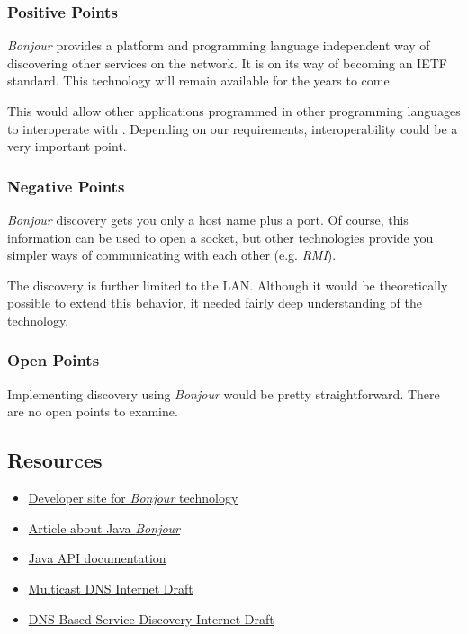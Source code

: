 \subsubsection{Positive Points}
\emph{Bonjour} provides a platform and programming language independent way of discovering other services on the network. It is on its way of becoming an IETF standard. This technology will remain available for the years to come.

This would allow other applications programmed in other programming languages to interoperate with \ace. Depending on our requirements, interoperability could be a very important point.

\subsubsection{Negative Points}
\emph{Bonjour} discovery gets you only a host name plus a port. Of course, this information can be used to open a socket, but other technologies provide you simpler ways of communicating with each other (e.g. \emph{RMI}).

The discovery is further limited to the LAN. Although it would be theoretically possible to extend this behavior, it needed fairly deep understanding of the technology.

\subsubsection{Open Points}
Implementing discovery using \emph{Bonjour} would be pretty straightforward. There are no open points to examine.


\subsection{Resources}
\begin{itemize}
 \item \href{http://developer.apple.com/darwin/projects/bonjour/}{Developer site for \emph{Bonjour} technology}
 \item \href{http://www.macdevcenter.com/pub/a/mac/2004/08/31/osx_java.html}{Article about Java \emph{Bonjour}}
 \item \href{http://developer.apple.com/documentation/Java/Reference/DNSServiceDiscovery_JavaRef/index.html}{Java API documentation}
 \item \href{http://files.multicastdns.org/draft-cheshire-dnsext-multicastdns.txt}{Multicast DNS Internet Draft}
 \item \href{http://files.dns-sd.org/draft-cheshire-dnsext-dns-sd.txt}{DNS Based Service Discovery Internet Draft}
\end{itemize}
